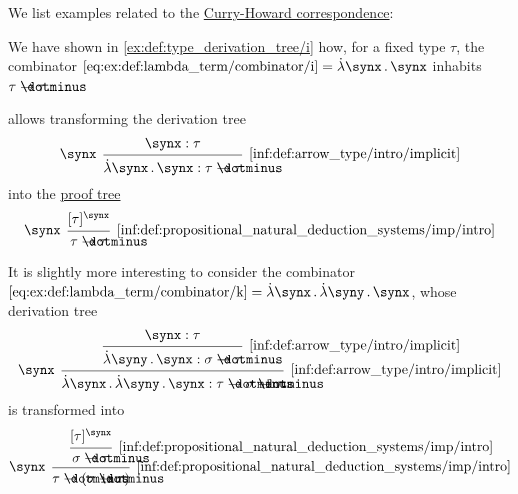 \begin{example}\label{ex:con:curry_howard_correspondence}
  We list examples related to the \hyperref[con:curry_howard_correspondence]{Curry-Howard correspondence}:
  \begin{thmenum}
     We have shown in \cref{ex:def:type_derivation_tree/i} how, for a fixed type \( \tau \), the combinator \( \ref{eq:ex:def:lambda_term/combinator/i} = \qabs \synx \synx \) inhabits \( \tau \synimplies \tau \).

     allows transforming the derivation tree
    \begin{equation*}
      \begin{prooftree}
        \hypo{ \synx: \tau }
        \infer[left label=\( \synx \)]1[\ref{inf:def:arrow_type/intro/implicit}]{ \qabs \synx \synx: \tau \synimplies \tau }
      \end{prooftree}
    \end{equation*}
    into the \hyperref[def:propositional_natural_deduction_proof_tree]{proof tree}
    \begin{equation*}
      \begin{prooftree}
        \hypo{ [\tau]^\synx }
        \infer[left label=\( \synx \)]1[\ref{inf:def:propositional_natural_deduction_systems/imp/intro}]{ \tau \synimplies \tau }
      \end{prooftree}
    \end{equation*}

    It is slightly more interesting to consider the combinator \( \ref{eq:ex:def:lambda_term/combinator/k} = \qabs \synx \qabs \syny \synx \), whose derivation tree
    \begin{equation*}
      \begin{prooftree}
        \hypo{ \synx: \tau }
        \infer1[\ref{inf:def:arrow_type/intro/implicit}]{ \qabs \syny \synx: \sigma \synimplies \tau }
        \infer[left label=\( \synx \)]1[\ref{inf:def:arrow_type/intro/implicit}]{ \qabs \synx \qabs \syny \synx: \tau \synimplies \sigma \synimplies \tau }
      \end{prooftree}
    \end{equation*}
    is transformed into
    \begin{equation*}
      \begin{prooftree}
        \hypo{ [\tau]^\synx }
        \infer1[\ref{inf:def:propositional_natural_deduction_systems/imp/intro}]{ \sigma \synimplies \tau }
        \infer[left label=\( \synx \)]1[\ref{inf:def:propositional_natural_deduction_systems/imp/intro}]{ \tau \synimplies (\sigma \synimplies \tau) }
      \end{prooftree}
    \end{equation*}


\end{thmenum}
\end{example}
